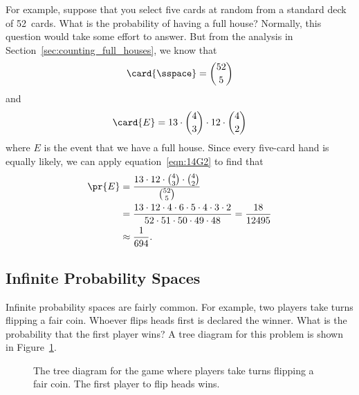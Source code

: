 For example, suppose that you select five cards at random from a
standard deck of 52~cards.  What is the probability of having a full
house?  Normally, this question would take some effort to answer.  But
from the analysis in Section~\ref{sec:counting_full_houses}, we know
that
\begin{equation*}
    \card{\sspace} = \binom{52}{5}
\end{equation*}
and
\begin{equation*}
    \card{E} = 13 \cdot \binom{4}{3} \cdot 12 \cdot \binom{4}{2}
\end{equation*}
where $E$ is the event that we have a full house.  Since every
five-card hand is equally likely, we can apply
equation~\eqref{eqn:14G2} to find that
\begin{align*}
\pr{E}  &= \frac{13 \cdot 12 \cdot \binom{4}{3} \cdot \binom{4}{2}}
                {\binom{52}{5}} \\
        &= \frac{13 \cdot 12 \cdot 4 \cdot 6 \cdot 5 \cdot 4 \cdot 3 \cdot 2}
                {52 \cdot 51 \cdot 50 \cdot 49 \cdot 48} = \frac{18}{12495} \\
        &\approx \frac{1}{694}.
\end{align*}

\subsection{Infinite Probability Spaces}

\iffalse
General probability theory deals with uncountable sets like~$\reals$,
but in computer science, it is usually sufficient to restrict our
attention to countable probability spaces.  It's also a lot
easier---infinite sample spaces are hard enough to work with without
having to deal with uncountable spaces.
\fi

Infinite probability spaces are fairly common.  For example, two
players take turns flipping a fair coin.  Whoever flips heads first is
declared the winner.  What is the probability that the first player
wins?  A tree diagram for this problem is shown in
Figure~\ref{fig:14A15}.

\begin{figure}


\caption{The tree diagram for the game where players take turns
  flipping a fair coin.  The first player to flip heads wins.}

\label{fig:14A15}

\end{figure}

